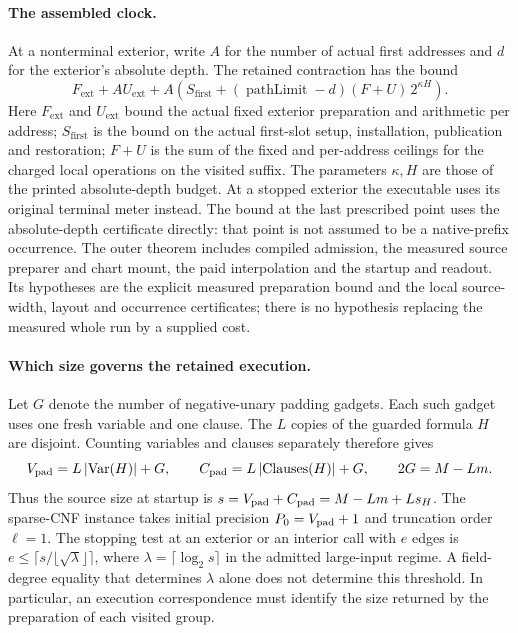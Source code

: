 \documentclass[11pt,a4paper]{article}
\begin{document}
\paragraph*{The assembled clock.}
At a nonterminal exterior, write \(A\) for the number of actual first
addresses and \(d\) for the exterior's absolute depth. The retained
contraction has the bound
\[
 F_{\mathrm{ext}}+A U_{\mathrm{ext}}
 +A\left(S_{\mathrm{first}}+
     (\operatorname{pathLimit}-d)(F+U)\,2^{\kappa H}\right).
\]
Here \(F_{\mathrm{ext}}\) and \(U_{\mathrm{ext}}\) bound the actual
fixed exterior preparation and arithmetic per address;
\(S_{\mathrm{first}}\) is the bound on the actual first-slot setup, installation,
publication and restoration; \(F+U\) is the sum of the fixed and per-address
ceilings for the charged local operations on the visited suffix. The parameters \(\kappa,H\) are those of the printed
absolute-depth budget. At a stopped exterior the executable uses its
original terminal meter instead. The bound at the last prescribed
point uses the absolute-depth certificate directly: that point is not
assumed to be a native-prefix occurrence. The outer theorem includes
compiled admission, the measured source preparer and chart mount,
the paid interpolation and the startup and readout. Its hypotheses
are the explicit measured preparation bound and the local
source-width, layout and occurrence certificates; there is no
hypothesis replacing the measured whole run by a supplied cost.


\paragraph*{Which size governs the retained execution.}
Let \(G\) denote the number of negative-unary padding gadgets.
Each such gadget uses one fresh variable and one clause. The \(L\)
copies of the guarded formula \(H\) are disjoint. Counting variables
and clauses separately therefore gives
\[
 V_{\rm pad}=L\,|\mathrm{Var}(H)|+G,\qquad
 C_{\rm pad}=L\,|\mathrm{Clauses}(H)|+G,\qquad 2G=M-Lm .
\]
Thus the source size at startup is \(s=V_{\rm pad}+C_{\rm pad}
=M-Lm+L s_H\). The sparse-CNF instance takes initial precision
\(P_0=V_{\rm pad}+1\) and truncation order \(\ell=1\).
The stopping test at an exterior or an interior call with \(e\) edges is
\(e\le\lceil s/\lfloor\sqrt{\lambda}\rfloor\rceil\), where
\(\lambda=\lceil\log_2 s\rceil\) in the admitted large-input regime.
A field-degree equality that determines \(\lambda\) alone does not
determine this threshold. In particular, an execution correspondence
must identify the size returned by the preparation of each visited group.
\end{document}
